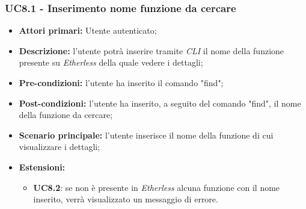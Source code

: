 \subsubsection{UC8.1 - Inserimento nome funzione da cercare}
\begin{itemize}
	\item \textbf{Attori primari:} Utente autenticato;
	\item \textbf{Descrizione:} l'utente potrà inserire tramite \textit{CLI\glo} il nome della funzione presente su \textit{Etherless} della quale vedere i dettagli; 
	\item \textbf{Pre-condizioni:} l'utente ha inserito il comando "find";
	\item \textbf{Post-condizioni:} l'utente ha inserito, a seguito del comando "find", il nome della funzione da cercare;
	\item \textbf{Scenario principale:} l'utente inserisce il nome della funzione di cui visualizzare i dettagli;
	\item \textbf{Estensioni:} 
	\begin{itemize}
		\item \textbf{UC8.2}: se non è presente in \textit{Etherless} alcuna funzione con il nome inserito, verrà visualizzato un messaggio di errore.
	\end{itemize}
\end{itemize}